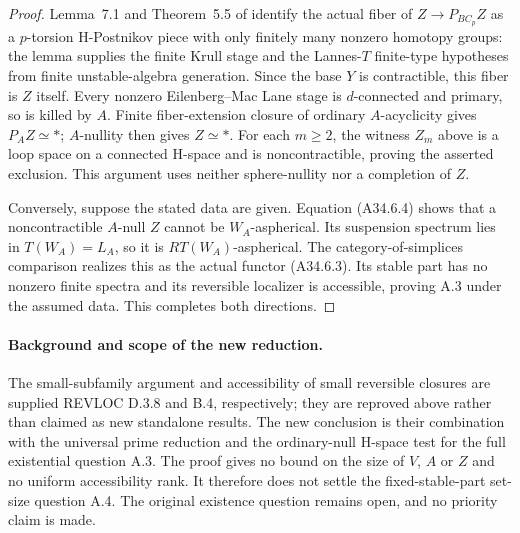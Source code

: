 \begin{proof}
Lemma~7.1 and Theorem~5.5 of
\citet{A4CCSDeconstruct2007} identify the actual fiber of
$Z\to P_{BC_p}Z$ as a $p$-torsion H-Postnikov piece with only
finitely many nonzero homotopy groups: the lemma supplies the
finite Krull stage and the Lannes-$T$ finite-type hypotheses
from finite unstable-algebra generation.
Since the base $Y$ is contractible, this fiber is $Z$ itself.
Every nonzero Eilenberg--Mac Lane stage is $d$-connected and
primary, so is killed by $A$.  Finite fiber-extension closure
of ordinary $A$-acyclicity gives $P_AZ\simeq *$; $A$-nullity
then gives $Z\simeq *$.  For each $m\geq2$, the witness $Z_m$
above is a loop space on a connected H-space and is
noncontractible, proving the asserted exclusion.  This argument
uses neither sphere-nullity nor a completion of $Z$.

Conversely, suppose the stated data are given.  Equation
\textup{(A34.6.4)} shows that a noncontractible $A$-null $Z$
cannot be $W_A$-aspherical.  Its suspension spectrum lies in
$T(W_A)=L_A$, so it is $RT(W_A)$-aspherical.
The category-of-simplices comparison realizes this as the actual
functor \textup{(A34.6.3)}.  Its stable part has no nonzero finite
spectra and its reversible localizer is accessible, proving A.3
under the assumed data.  This completes both directions.
\end{proof}

\paragraph{Background and scope of the new reduction.}
The small-subfamily argument and accessibility of small reversible
closures are supplied REVLOC D.3.8 and B.4, respectively; they are
reproved above rather than claimed as new standalone results.
The new conclusion is their combination with the universal prime
reduction and the ordinary-null H-space test for the full
existential question A.3.  The proof gives no bound on the size
of $V$, $A$ or $Z$ and no uniform accessibility rank.  It therefore
does not settle the fixed-stable-part set-size question A.4.
The original existence question remains open, and no priority
claim is made.
